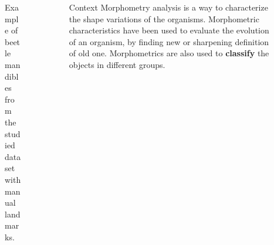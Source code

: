 \documentclass{LaBRI_poster}
\begin{document}
\begin{frame}[t]
\begin{columns}[t]
\begin{column}{\threecolwidth}
\begin{figure}[h]
\caption{Example of beetle mandibles from the studied data set with
  manual landmarks.}
\label{fig1}
\end{figure}

\end{column}

\begin{column}{\sepwidth}\end{column} %

\begin{column}{\twothirdcolwidth}
 \begin{alertblock}{Context}
	Morphometry analysis is a way to characterize the shape variations of the organisms. Morphometric characteristics have been used to evaluate the evolution of an organism, by finding new or sharpening definition of old one. Morphometrics are also used to \textbf{classify} the objects in different groups.
 \end{alertblock}
 

\end{column}
\end{columns}
\end{frame}
\end{document}
